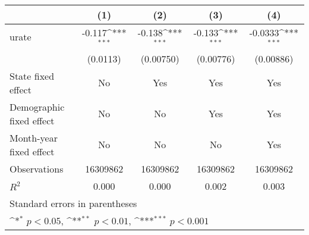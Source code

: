 {
\def\sym#1{\ifmmode^{#1}\else\(^{#1}\)\fi}
\begin{tabular}{l*{4}{c}}
\hline\hline
                                   &\multicolumn{1}{c}{(1)}         &\multicolumn{1}{c}{(2)}         &\multicolumn{1}{c}{(3)}         &\multicolumn{1}{c}{(4)}         \\
\hline
urate                              &      -0.117\sym{***}&      -0.138\sym{***}&      -0.133\sym{***}&     -0.0333\sym{***}\\
                                   &    (0.0113)         &   (0.00750)         &   (0.00776)         &   (0.00886)         \\
[1em]
State fixed effect                 &          No         &         Yes         &         Yes         &         Yes         \\
[1em]
Demographic fixed effect           &          No         &          No         &         Yes         &         Yes         \\
[1em]
Month-year fixed effect            &          No         &          No         &          No         &         Yes         \\
\hline
Observations                       &    16309862         &    16309862         &    16309862         &    16309862         \\
\(R^{2}\)                          &       0.000         &       0.000         &       0.002         &       0.003         \\
\hline\hline
\multicolumn{5}{l}{\footnotesize Standard errors in parentheses}\\
\multicolumn{5}{l}{\footnotesize \sym{*} \(p<0.05\), \sym{**} \(p<0.01\), \sym{***} \(p<0.001\)}\\
\end{tabular}
}
